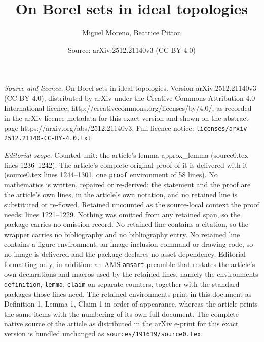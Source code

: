 \documentclass[10pt,a4paper]{amsart}
\title{On Borel sets in ideal topologies}
\author{Miguel Moreno, Beatrice Pitton}
\date{Source: arXiv:2512.21140v3 (CC BY 4.0)}
\begin{document}
\maketitle

\noindent\emph{Source and licence.} On Borel sets in ideal topologies. Version arXiv:2512.21140v3 (CC BY 4.0), distributed by arXiv under the Creative Commons Attribution 4.0 International licence, http://creativecommons.org/licenses/by/4.0/, as recorded in the arXiv licence metadata for this exact version and shown on the abstract page https://arxiv.org/abs/2512.21140v3. Full licence notice: \texttt{licenses/arxiv-2512.21140-CC-BY-4.0.txt}.\par\smallskip

\noindent\textit{Editorial scope.} Counted unit: the article's lemma approx\_lemma (source0.tex lines 1236--1242). The article's complete original proof of it is delivered with it (source0.tex lines 1244--1301, one \texttt{proof} environment of 58 lines). No mathematics is written, repaired or re-derived: the statement and the proof are the article's own lines, in the article's own notation, and no retained line is substituted or re-flowed.  Retained uncounted as the source-local context the proof needs: lines 1221--1229.  Nothing was omitted from any retained span, so the package carries no omission record.  No retained line contains a citation, so the wrapper carries no bibliography and no bibliography entry.  No retained line contains a figure environment, an image-inclusion command or drawing code, so no image is delivered and the package declares no asset dependency.  Editorial formatting only, in addition: an AMS \texttt{amsart} preamble that restates the article's own declarations and macros used by the retained lines, namely the environments \texttt{definition}, \texttt{lemma}, \texttt{claim} on separate counters, together with the standard packages those lines need.  The retained environments print in this document as Definition 1, Lemma 1, Claim 1 in order of appearance, whereas the article prints the same items with the numbering of its own full document.  The complete native source of the article as distributed in the arXiv e-print for this exact version is bundled unchanged as \texttt{sources/191619/source0.tex}.
\end{document}
